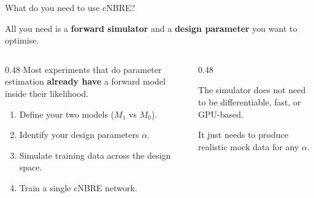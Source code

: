 \documentclass[aspectratio=169]{beamer}
\begin{document}
\begin{frame}{\small{What do you need to use cNBRE?}}
\vfill
\begin{center}
\begin{tcolorbox}[keybox, width=0.80\textwidth]
\normalsize
\centering
All you need is a \textbf{forward simulator} and a \textbf{design parameter} you want to optimise.
\end{tcolorbox}
\end{center}

\vspace{0.3cm}
\small
\begin{columns}[T,onlytextwidth]
\begin{column}{0.48\textwidth}
Most experiments that do parameter estimation \textbf{already have} a forward model inside their likelihood.

\vspace{0.1cm}
\begin{enumerate}
\item Define your two models ($M_1$ vs $M_0$).
\item Identify your design parameters $\alpha$.
\item Simulate training data across the design space.
\item Train a single cNBRE network.
\end{enumerate}
\end{column}
\begin{column}{0.48\textwidth}
\begin{tcolorbox}[resultbox]
\small
The simulator does not need to be differentiable, fast, or GPU-based.

\vspace{0.05cm}
It just needs to produce realistic mock data for any $\alpha$.
\end{tcolorbox}
\end{column}
\end{columns}
\vfill
\end{frame}
\end{document}
